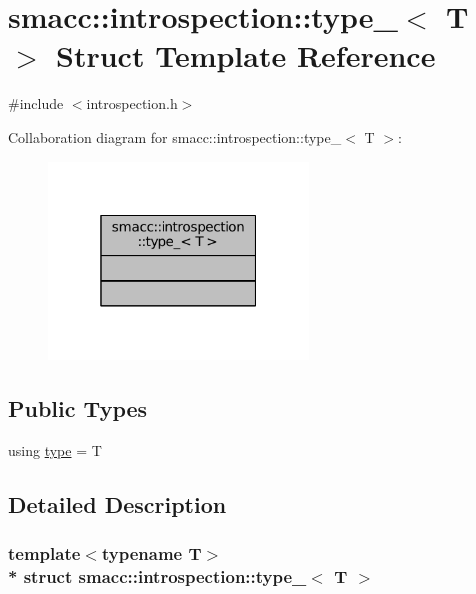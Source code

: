 \hypertarget{structsmacc_1_1introspection_1_1type__}{}\section{smacc\+:\+:introspection\+:\+:type\+\_\+$<$ T $>$ Struct Template Reference}
\label{structsmacc_1_1introspection_1_1type__}


{\ttfamily \#include $<$introspection.\+h$>$}



Collaboration diagram for smacc\+:\+:introspection\+:\+:type\+\_\+$<$ T $>$\+:
\nopagebreak
\begin{figure}[H]
\begin{center}
\leavevmode
\includegraphics[width=196pt]{structsmacc_1_1introspection_1_1type____coll__graph}
\end{center}
\end{figure}
\subsection*{Public Types}
\begin{DoxyCompactItemize}
\item 
using \hyperlink{structsmacc_1_1introspection_1_1type___afe9e4516cea9d3160f2eff1b787ca4f5}{type} = T
\end{DoxyCompactItemize}


\subsection{Detailed Description}
\subsubsection*{template$<$typename T$>$\\*
struct smacc\+::introspection\+::type\+\_\+$<$ T $>$}



